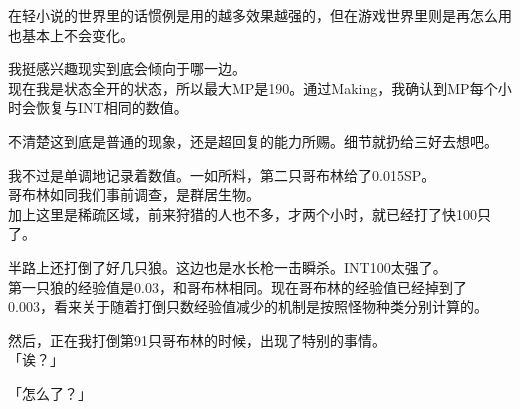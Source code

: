在轻小说的世界里的话惯例是用的越多效果越强的，但在游戏世界里则是再怎么用也基本上不会变化。

我挺感兴趣现实到底会倾向于哪一边。\\

现在我是状态全开的状态，所以最大MP是190。通过Making，我确认到MP每个小时会恢复与INT相同的数值。

不清楚这到底是普通的现象，还是超回复的能力所赐。细节就扔给三好去想吧。

我不过是单调地记录着数值。一如所料，第二只哥布林给了0.015SP。\\

哥布林如同我们事前调查，是群居生物。\\

加上这里是稀疏区域，前来狩猎的人也不多，才两个小时，就已经打了快100只了。

半路上还打倒了好几只狼。这边也是水长枪一击瞬杀。INT100太强了。\\

第一只狼的经验值是0.03，和哥布林相同。现在哥布林的经验值已经掉到了0.003，看来关于随着打倒只数经验值减少的机制是按照怪物种类分别计算的。

然后，正在我打倒第91只哥布林的时候，出现了特别的事情。\\

「诶？」

「怎么了？」\\

